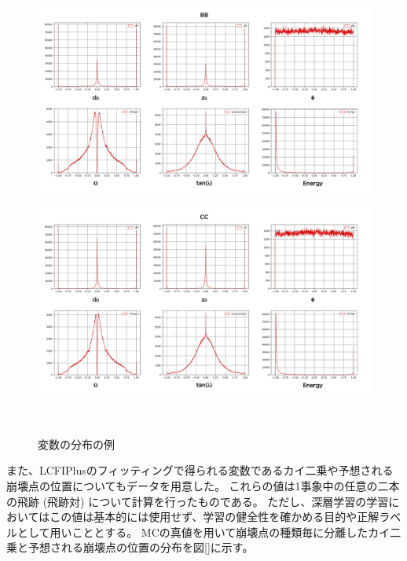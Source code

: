 \begin{figure}[h]
  \begin{minipage}{1.0\textwidth}
  \centering
   \begin{minipage}{0.48\textwidth}
   \centering
    \includegraphics[width=1.0\textwidth, clip]{Figure/3Networks/3-1-2-1ReshapedVariablesBB.png}
    \label{3-1-2-1ReshapedVariablesBB}
   \end{minipage}
   \begin{minipage}{0.48\textwidth}
   \centering
    \includegraphics[width=1.0\textwidth, clip]{Figure/3Networks/3-1-2-1ReshapedVariablesCC.png}
    \label{3-1-2-1ReshapedVariablesCC}
   \end{minipage}
   \end{minipage}
  \caption{変数の分布の例}
  \label{3-1-2-1Variables}
\end{figure}

また、LCFIPlusのフィッティングで得られる変数であるカイ二乗や予想される崩壊点の位置についてもデータを用意した。
これらの値は1事象中の任意の二本の飛跡 (飛跡対) について計算を行ったものである。
ただし、深層学習の学習においてはこの値は基本的には使用せず、学習の健全性を確かめる目的や正解ラベルとして用いこととする。
MCの真値を用いて崩壊点の種類毎に分離したカイ二乗と予想される崩壊点の位置の分布を図\ref{}に示す。



